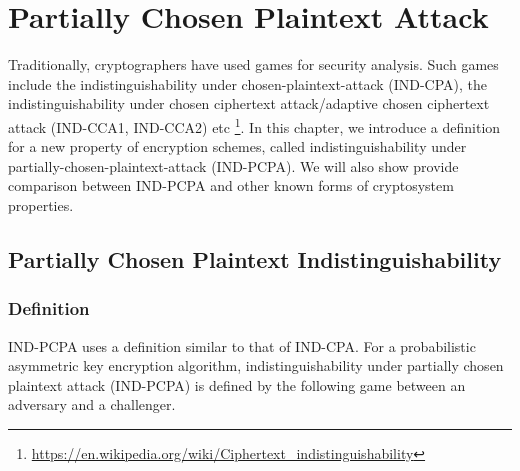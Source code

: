 \chapter{Partially Chosen Plaintext Attack}\label{ch:pcpa}

Traditionally, cryptographers have used games for security analysis. Such games
include the indistinguishability under chosen-plaintext-attack (IND-CPA), the
indistinguishability under chosen ciphertext attack/adaptive chosen ciphertext
attack (IND-CCA1, IND-CCA2) etc
\footnote{\url{https://en.wikipedia.org/wiki/Ciphertext_indistinguishability}}.
In this chapter, we introduce a definition for a new property of encryption
schemes, called indistinguishability under partially-chosen-plaintext-attack
(IND-PCPA). We will also show provide comparison between IND-PCPA and other
known forms of cryptosystem properties.

\section{Partially Chosen Plaintext Indistinguishability}\label{sec:indpcpa}

\subsection{Definition} IND-PCPA uses a definition similar to that of IND-CPA.
For a probabilistic asymmetric key encryption algorithm, indistinguishability
under partially chosen plaintext attack (IND-PCPA) is defined by the following
game between an adversary and a challenger.


